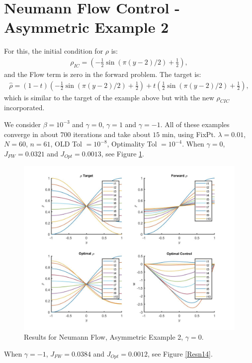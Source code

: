 \documentclass[11pt, a4paper]{article}
\theoremstyle{definition}
\begin{document}
\section{Neumann Flow Control - Asymmetric Example 2}
For this, the initial condition for $\rho$ is:
\begin{align*}
\rho_{IC} = (-\frac{1}{2}\sin(\pi (y - 2)/2) + \frac{1}{2}),
\end{align*}
and the Flow term is zero in the forward problem.
The target is:
\begin{align*}
\hat \rho = (1-t)(-\frac{1}{2}\sin(\pi (y - 2)/2) + \frac{1}{2}) + t(\frac{1}{2}\sin(\pi(y - 2)/2) + \frac{1}{2}),
\end{align*}
which is similar to the target of the example above but with the new $\rho_{CIC}$ incorporated.

We consider $\beta = 10^{-3}$ and $\gamma = 0$, $\gamma = 1$ and $\gamma = -1$. All of these examples converge in about $700$ iterations and take about $15$ min, using FixPt. $\lambda = 0.01$, $N= 60$, $n = 61$, OLD Tol $= 10^{-8}$, Optimality Tol $=10^{-4}$.
When $\gamma = 0$, $J_{FW} = 0.0321$ and $J_{Opt} = 0.0013$, see Figure \ref{Res04}.
\begin{figure}[h]
	\includegraphics[scale=0.3]{Res04.jpg}
	\caption{Results for Neumann Flow, Asymmetric Example 2, $\gamma = 0$.}
	\label{Res04}
\end{figure}
When $\gamma = -1$, $J_{FW} = 0.0384$ and $J_{Opt} = 0.0012$, see Figure \ref{Resn14}.
\end{document}
